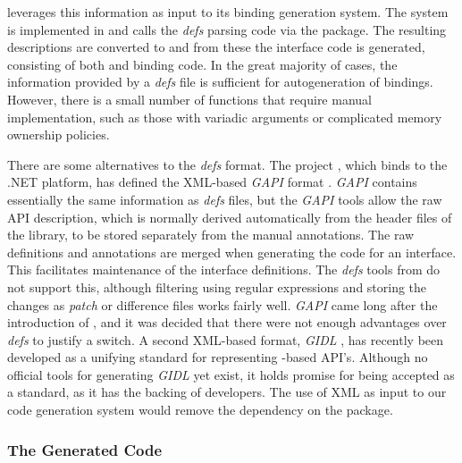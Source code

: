 \documentclass[article]{jss}
\begin{document}
 leverages this information as input to its binding
generation system.  The system is implemented in  and
calls the  \emph{defs} parsing code via the 
\citep{RSPython} package.  The resulting descriptions are converted to
 and from these the interface code is generated,
consisting of both  and  binding code. In the
great majority of cases, the information provided by a \emph{defs}
file is sufficient for autogeneration of bindings.  However, there is
a small number of functions that require manual implementation, such
as those with variadic arguments or complicated memory ownership
policies.

There are some alternatives to the \emph{defs} format. The 
project \citep{gtksharp}, which binds  to the .NET platform, has defined the XML-based \emph{GAPI} format \citep{GAPI}.
\emph{GAPI} contains essentially the same information as \emph{defs}
files,
but the \emph{GAPI} tools allow the raw API description, which is normally derived automatically from the header files of the library, to be stored separately from the manual annotations. The raw definitions and annotations are merged when generating the code for an interface. This facilitates maintenance of the interface definitions. The \emph{defs} tools from  do not support this,
although filtering using regular expressions and storing the changes
as \textsl{patch} or difference files works fairly well. \emph{GAPI}
came long after the introduction of , and it was decided
that there were not enough advantages over \emph{defs} to justify a
switch. A second XML-based format, \emph{GIDL} \citep{gidl}, has
recently been developed as a unifying standard for representing
-based API's. Although no official tools for generating
\emph{GIDL} yet exist, it holds promise for being accepted as a
standard, as it has the backing of  developers. The use of XML as input to our code generation system would remove the dependency on the  package.

\subsubsection{The Generated Code}
\end{document}
